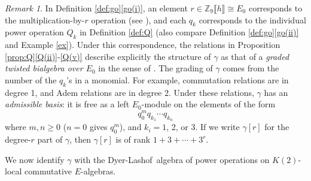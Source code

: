 \documentclass{gtpart}
\theoremstyle{definition}
\theoremstyle{remark}
\newtheorem{rmk}[thm]{Remark}
\newcommand{\mb}[1]{\mathbb{#1}}
\newcommand{\DL}{Dyer-Lashof~}
\newcommand{\BZ}{{\mb Z}}
\newcommand{\g}{\gamma}
\newcommand{\q}[1]{Proposition \ref{prop:Q}\thinspace \eqref{Q(#1)}}
\newcommand{\go}[1]{Definition \ref{def:go}\thinspace \eqref{go(#1)}}
\begin{document}
\begin{rmk}
\label{rmk:rank}
 In \go{i}, an element $r \in \BZ_9 \llbracket h \rrbracket \cong E_0$ 
 corresponds to the multiplication-by-$r$ operation (see 
 \cite[discussion following Proposition 6.3]{cong}), and each $q_k$ 
 corresponds to the individual power operation $Q_k$ in Definition 
 \ref{def:Q} (also compare \go{ii} and Example \ref{ex}).  Under this 
 correspondence, the relations in \q{ii}-\eqref{Q(v)} describe 
 explicitly the structure of $\g$ as that of a {\em graded twisted 
 bialgebra over $E_0$} in the sense of \cite[Section 5]{cong}.  The 
 grading of $\g$ comes from the number of the $q_k$'s in a monomial.  
 For example, commutation relations are in degree 1, and Adem relations 
 are in degree 2.  Under these relations, $\g$ has an {\em admissible 
 basis}: it is free as a left $E_0$-module on the elements of the form 
 \[
  q_0^m q_{k_1} \cdots q_{k_n} 
 \]
 where $m, n \geq 0$ ($n = 0$ gives $q_0^m$), and $k_i = 1$, 2, or 3.  
 If we write $\g[r]$ for the degree-$r$ part of $\g$, then $\g[r]$ is of 
 rank $1 + 3 + \cdots + 3^r$.  
\end{rmk}

We now identify $\g$ with the \DL algebra of power operations on 
$K(2)$-local commutative $E$-algebras.  
\end{document}
